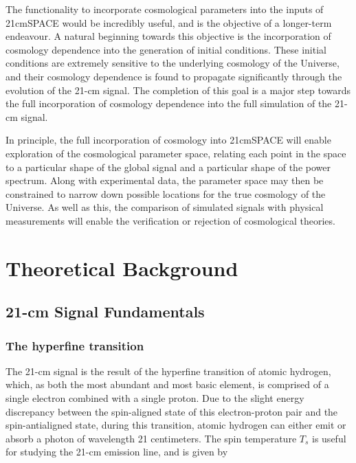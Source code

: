 \documentclass[floats,floatfix,showpacs,amssymb,prd,superscriptaddress,nofootinbib]{revtex4-2} %
\begin{document}

The functionality to incorporate cosmological parameters into the inputs of 21cmSPACE would be incredibly useful, and is the objective of a longer-term endeavour. A natural beginning towards this objective is the incorporation of cosmology dependence into the generation of initial conditions. These initial conditions are extremely sensitive to the underlying cosmology of the Universe, and their cosmology dependence is found to propagate significantly through the evolution of the 21-cm signal. The completion of this goal is a major step towards the full incorporation of cosmology dependence into the full simulation of the 21-cm signal.


In principle, the full incorporation of cosmology into 21cmSPACE will enable exploration of the cosmological parameter space, relating each point in the space to a particular shape of the global signal and a particular shape of the power spectrum. Along with experimental data, the parameter space may then be constrained to narrow down possible locations for the true cosmology of the Universe. As well as this, the comparison of simulated signals with physical measurements will enable the verification or rejection of cosmological theories.


\newpage
\section{Theoretical Background}
\subsection{21-cm Signal Fundamentals}
\subsubsection{The hyperfine transition}
The 21-cm signal is the result of the hyperfine transition of atomic hydrogen, which, as both the most abundant and most basic element, is comprised of a single electron combined with a single proton. Due to the slight energy discrepancy between the spin-aligned state of this electron-proton pair and the spin-antialigned state, during this transition, atomic hydrogen can either emit or absorb a photon of wavelength 21 centimeters. The spin temperature $T_s$ is useful for studying the 21-cm emission line, and is given by \citep{Liu_Shaw_2020}
\end{document}
